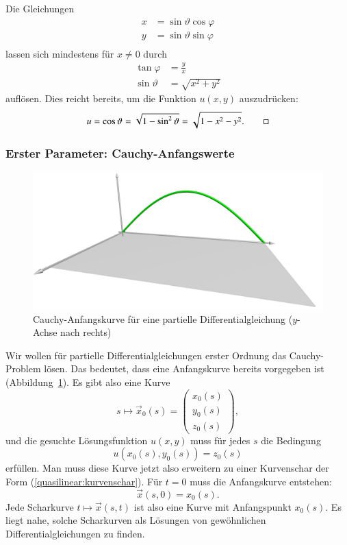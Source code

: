 \begin{beispiel}
Die Gleichungen
\begin{align*}
x&=\sin\vartheta\cos\varphi\\
y&=\sin\vartheta\sin\varphi\\
\end{align*}
lassen sich mindestens für $x\ne 0$ durch
\begin{align*}
\tan\varphi&=\frac{y}{x}\\
\sin\vartheta &=\sqrt{x^2+y^2}
\end{align*}
auflösen. Dies reicht bereits, um die Funktion $u(x,y)$
auszudrücken:
\[
u=\cos\vartheta=\sqrt{1-\sin^2\vartheta}=\sqrt{1-x^2-y^2}.
\qedhere
\]
\end{beispiel}

\subsubsection{Erster Parameter: Cauchy-Anfangswerte}
\begin{figure}
\begin{center}
\includegraphics[width=\hsize]{../common/3d/cauchy.jpg}
\end{center}
\caption{Cauchy-Anfangskurve für eine partielle Differentialgleichung
($y$-Achse nach rechts)
\label{geometrie:cauchy-anfangskurve}}
\end{figure}
Wir wollen für partielle Differentialgleichungen erster Ordnung
das Cauchy-Problem lösen.
Das bedeutet, dass eine Anfangskurve bereits vorgegeben ist
(Abbildung~\ref{geometrie:cauchy-anfangskurve}).
Es gibt also eine Kurve
\begin{equation}
s\mapsto\vec x_0(s)=\begin{pmatrix}
x_0(s)\\
y_0(s)\\
z_0(s)
\end{pmatrix},
\label{quasilinear:anfangskurve}
\end{equation}
und die gesuchte Lösungsfunktion $u(x,y)$ muss für jedes $s$ die
Bedingung
\[
u(x_0(s), y_0(s))=z_0(s)
\]
erfüllen.
Man muss diese Kurve jetzt also erweitern zu einer Kurvenschar
der Form (\ref{quasilinear:kurvenschar}).
Für $t=0$ muss die Anfangskurve entstehen:
\[
\vec x(s,0)=x_0(s).
\]
Jede Scharkurve $t\mapsto \vec x(s,t)$ ist also eine Kurve
mit Anfangspunkt $x_0(s)$.
Es liegt nahe, solche Scharkurven als Lösungen von gewöhnlichen
Differentialgleichungen zu finden.

